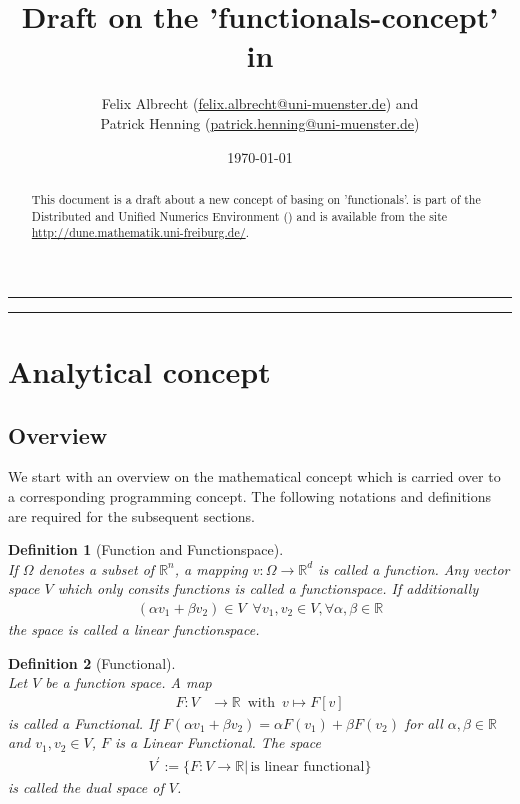 \documentclass[a4paper,11pt]{article}
\title{Draft on the 'functionals-concept' in \dunefem}
\author{Felix Albrecht (\url{felix.albrecht@uni-muenster.de}) and \\Patrick Henning (\url{patrick.henning@uni-muenster.de})}
\date{\today}
\numberwithin{equation}{section}
\newtheorem{definition}{Definition}[section]
\newcommand{\theoremNewline}{\hspace{1mm}\\}
\newcommand{\theoremEndLine}{\hspace{1mm}}
\newcommand{\R}{\mathbb{R}}
\begin{document}
  \maketitle

  \begin{abstract}
    This document is a draft about a new concept of \dunefem basing on 'functionals'. \dunefem is part of the Distributed and
    Unified Numerics Environment (\dune) and is available from the site \url{http://dune.mathematik.uni-freiburg.de/}.
  \end{abstract}

  \hrule

  \begin{multicols}{2}
    \small\tableofcontents
  \end{multicols}

  \hrule
  \section{Analytical concept}

  \subsection{Overview}
We start with an overview on the mathematical concept which is carried over to a corresponding programming concept. The following notations and definitions are required for the subsequent sections.

    \begin{definition}[Function and Functionspace]\theoremNewline
    If $\Omega$ denotes a subset of $\mathbb{R}^n$, a mapping $v : \Omega \rightarrow \mathbb{R}^d $ is called a \textnormal{function}. Any vector space $V$ which only consits functions is called a \textnormal{functionspace}. If additionally 
    \begin{align*}
    (\alpha v_1 + \beta v_2) \in V \enspace \forall v_1,v_2 \in V, \forall \alpha,\beta \in \R 
    \end{align*}
    the space is called a \textnormal{linear functionspace}.
    \end{definition}\theoremEndLine

    \begin{definition}[Functional]\theoremNewline
      Let $V$ be a function space. A map
      \begin{align}
        F: V &\rightarrow \R \enspace \mbox{with} \enspace v \mapsto F[v]
      \end{align}
      is called a \textnormal{Functional}. If $F(\alpha v_1 + \beta v_2) = \alpha F(v_1) + \beta F(v_2)$ for all $\alpha,\beta \in \R$ and $v_1,v_2\in V$, $F$ is a \textnormal{Linear Functional}. The space
      \begin{align}
        V^{\prime} := \{ F : V \rightarrow \R | \hspace{2pt} \mbox{is linear functional} \}
      \end{align}
      is called the dual space of $V$.
    \end{definition}\theoremEndLine
\end{document}
